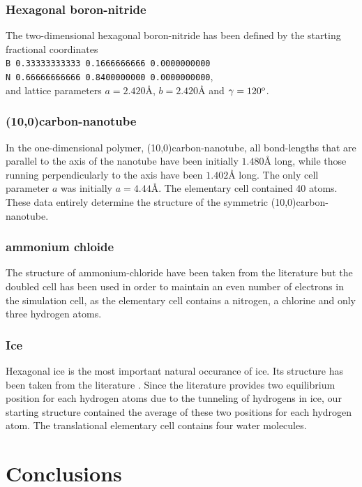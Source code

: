 \documentclass[prl,aps,preprint,superbib,12pt]{revtex4}
\begin{document}
\subsubsection{Hexagonal boron-nitride}
The two-dimensional hexagonal boron-nitride has been 
defined by the starting fractional coordinates
\\
{\tt B 0.33333333333 0.1666666666 0.0000000000} \\
{\tt N 0.66666666666 0.8400000000 0.0000000000}, \\
and lattice parameters $a=2.420${\AA}, $b=2.420${\AA} and 
$\gamma=120^{\rm o}$.

\subsubsection{(10,0)carbon-nanotube}
In the one-dimensional polymer, (10,0)carbon-nanotube,
all bond-lengths that are parallel to the axis of the
nanotube have been initially $1.480${\AA} long, while those
running perpendicularly to the axis have been $1.402${\AA} long.
The only cell parameter $a$ was initially $a=4.44${\AA}. The
elementary cell contained 40 atoms. These data entirely determine
the structure of the symmetric (10,0)carbon-nanotube.

\subsubsection{ammonium chloide}
The structure of ammonium-chloride have been 
taken from the literature \cite{DBSirdeshmukh70} but the
doubled cell has been used in order to maintain
an even number of electrons in the simulation cell, as the elementary
cell contains a nitrogen, a chlorine and only three hydrogen atoms.

\subsubsection{Ice}
Hexagonal ice is the most important natural occurance of ice.
Its structure has been taken from the literature \cite{AGoto90}. 
Since the literature provides two equilibrium position
for each hydrogen atoms due to the tunneling of hydrogens in ice,
our starting structure contained the average of these two positions
for each hydrogen atom. The translational elementary cell contains
four water molecules.


\section{Conclusions} \label{Conclusions}


\end{document}
